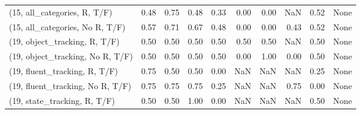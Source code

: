 \begin{table*}[h!]
\begin{adjustbox}{width=2\columnwidth,center}
\begin{tabular}{lrrr|rrr|rrr}
(15, all\_categories, R, T/F)          &                      0.48 &                  0.75 &                      0.48 &                          0.33 &                      0.00 &                          0.00 &                                    NaN &                               0.52 &                                  None \\
(15, all\_categories, No R, T/F)       &                      0.57 &                  0.71 &                      0.67 &                          0.48 &                      0.00 &                          0.00 &                                   0.43 &                               0.52 &                                  None \\



\midrule
(19, object\_tracking, R, T/F)         &                      0.50 &                  0.50 &                      0.50 &                          0.50 &                      0.50 &                          0.50 &                                    NaN &                               0.50 &                                  None \\
(19, object\_tracking, No R, T/F)      &                      0.50 &                  0.50 &                      0.50 &                          0.50 &                      0.00 &                          1.00 &                                   0.00 &                               0.50 &                                  None \\
(19, fluent\_tracking, R, T/F)         &                      0.75 &                  0.50 &                      0.50 &                          0.00 &                       NaN &                           NaN &                                    NaN &                               0.25 &                                  None \\
(19, fluent\_tracking, No R, T/F)      &                      0.75 &                  0.75 &                      0.75 &                          0.25 &                       NaN &                           NaN &                                   0.75 &                               0.00 &                                  None \\
(19, state\_tracking, R, T/F)          &                      0.50 &                  0.50 &                      1.00 &                          0.00 &                       NaN &                           NaN &                                    NaN &                               0.50 &                                  None \\

\end{tabular}
\end{adjustbox}
\end{table*}
